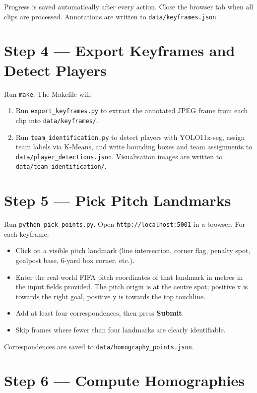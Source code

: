 Progress is saved automatically after every action. Close the browser tab when all clips are processed. Annotations are written to \texttt{data/keyframes.json}.

\section*{Step 4 — Export Keyframes and Detect Players}

Run \texttt{make}. The Makefile will:
\begin{enumerate}
  \item Run \texttt{export\_keyframes.py} to extract the annotated JPEG frame from each clip into \texttt{data/keyframes/}.
  \item Run \texttt{team\_identification.py} to detect players with YOLO11x-seg, assign team labels via K-Means, and write bounding boxes and team assignments to \texttt{data/player\_detections.json}. Visualisation images are written to \texttt{data/team\_identification/}.
\end{enumerate}

\section*{Step 5 — Pick Pitch Landmarks}

Run \texttt{python pick\_points.py}. Open \texttt{http://localhost:5001} in a browser. For each keyframe:

\begin{itemize}
  \item Click on a visible pitch landmark (line intersection, corner flag, penalty spot, goalpost base, 6-yard box corner, etc.).
  \item Enter the real-world FIFA pitch coordinates of that landmark in metres in the input fields provided. The pitch origin is at the centre spot; positive x is towards the right goal, positive y is towards the top touchline.
  \item Add at least four correspondences, then press \textbf{Submit}.
  \item Skip frames where fewer than four landmarks are clearly identifiable.
\end{itemize}

Correspondences are saved to \texttt{data/homography\_points.json}.

\section*{Step 6 — Compute Homographies}

